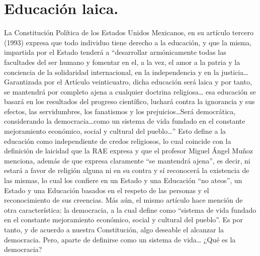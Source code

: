 \documentclass[12pt]{book} %
\begin{document}
\section{Educación laica.}
La Constitución Política de los Estados Unidos Mexicanos, en su artículo tercero (1993) expresa que todo individuo tiene derecho a la educación, y que la misma, impartida por el Estado tenderá a “desarrollar armónicamente todas las facultades del ser humano y fomentar en el, a la vez, el amor a la patria y la conciencia de la solidaridad internacional, en la independencia y en la justicia… Garantizada por el Artículo veinticuatro, dicha educación será laica y por tanto, se mantendrá por completo ajena a cualquier doctrina religiosa… esa educación se basará en los resultados del progreso científico, luchará contra la ignorancia y sus efectos, las servidumbres, los fanatismos y los prejuicios\ldots Será democrática, considerando la democracia\ldots como un sistema de vida fundado en el constante mejoramiento económico, social y cultural del pueblo…” Esto define a la educación como independiente de credos religiosos, lo cual coincide con la definición de laicidad que la RAE expresa y que el profesor Miguel Ángel Muñoz menciona, además de que expresa claramente “se mantendrá ajena”, es decir, ni estará a favor de religión alguna ni en su contra y sí reconocerá la existencia de las mismas, lo cual los confiere en un Estado y una Educación “no ateos”, un Estado y una Educación basados en el respeto de las personas y el reconocimiento de sus creencias. Más aún, el mismo artículo hace mención de otra característica: la democracia, a la cual define como “sistema de vida fundado en el constante mejoramiento económico, social y cultural del pueblo”. Es por tanto, y de acuerdo a nuestra Constitución, algo deseable el alcanzar la democracia. Pero, aparte de definirse como un sistema de vida… ¿Qué es la democracia?\\
\end{document}

